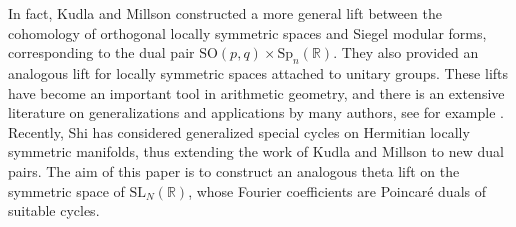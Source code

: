 \documentclass[a4paper,11pt]{amsart} %
\newcommand{\8}{\infty}
\newcommand{\SO}{\mathrm{SO}}
\newcommand{\SL}{\mathrm{SL}}
\newcommand{\Sp}{\mathrm{Sp}}
\newcommand{\R}{\mathbb{R}}
\theoremstyle{mytheoremstyle}
\theoremstyle{remark}
\numberwithin{equation}{section}
\begin{document}
In fact, Kudla and Millson constructed a more general lift between the cohomology of orthogonal locally symmetric spaces and Siegel modular forms, corresponding to the dual pair $\SO(p,q) \times \Sp_n(\R)$. They also provided an analogous lift for locally symmetric spaces attached to unitary groups. These lifts have become an important tool in arithmetic geometry, and there is an extensive literature on generalizations and applications by many authors, see for example \cite{fbtwolifts,bfinj,bmm,blmm,EY20,fmbound1,fmcoef,funkmil,G20,garcia23,KZ25,MZ26,Z24}.
Recently, Shi \cite{shi} has considered generalized special cycles on Hermitian locally symmetric manifolds, thus extending the work of Kudla and Millson to new dual pairs.
The aim of this paper is to construct an analogous theta lift on the symmetric space of $\SL_N(\R) $, whose Fourier coefficients are Poincaré duals of suitable cycles.
\end{document}
